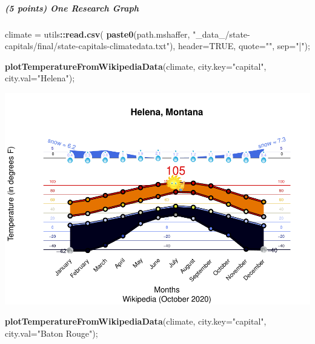 \documentclass[
]{article}
\newenvironment{Shaded}{\begin{snugshade}}{\end{snugshade}}
\newcommand{\DataTypeTok}[1]{\textcolor[rgb]{0.13,0.29,0.53}{#1}}
\newcommand{\KeywordTok}[1]{\textcolor[rgb]{0.13,0.29,0.53}{\textbf{#1}}}
\newcommand{\NormalTok}[1]{#1}
\newcommand{\OperatorTok}[1]{\textcolor[rgb]{0.81,0.36,0.00}{\textbf{#1}}}
\newcommand{\OtherTok}[1]{\textcolor[rgb]{0.56,0.35,0.01}{#1}}
\newcommand{\StringTok}[1]{\textcolor[rgb]{0.31,0.60,0.02}{#1}}
\begin{document}
\hypertarget{points-one-research-graph}{%
\subparagraph{(5 points) One Research
Graph}\label{points-one-research-graph}}

\begin{Shaded}
\begin{Highlighting}[]
\NormalTok{climate =}\StringTok{ }\NormalTok{utils}\OperatorTok{::}\KeywordTok{read.csv}\NormalTok{( }\KeywordTok{paste0}\NormalTok{(path.mshaffer, }\StringTok{"\_data\_/state{-}capitals/final/state{-}capitals{-}climatedata.txt"}\NormalTok{), }\DataTypeTok{header=}\OtherTok{TRUE}\NormalTok{, }\DataTypeTok{quote=}\StringTok{""}\NormalTok{, }\DataTypeTok{sep=}\StringTok{"|"}\NormalTok{);}


\KeywordTok{plotTemperatureFromWikipediaData}\NormalTok{(climate, }\DataTypeTok{city.key=}\StringTok{"capital"}\NormalTok{, }\DataTypeTok{city.val=}\StringTok{"Helena"}\NormalTok{);}
\end{Highlighting}
\end{Shaded}

\includegraphics{graphics/chunk-hclust-climate-one-research-graph-1.pdf}

\begin{Shaded}
\begin{Highlighting}[]
\KeywordTok{plotTemperatureFromWikipediaData}\NormalTok{(climate, }\DataTypeTok{city.key=}\StringTok{"capital"}\NormalTok{, }\DataTypeTok{city.val=}\StringTok{"Baton Rouge"}\NormalTok{);}
\end{Highlighting}
\end{Shaded}
\end{document}
